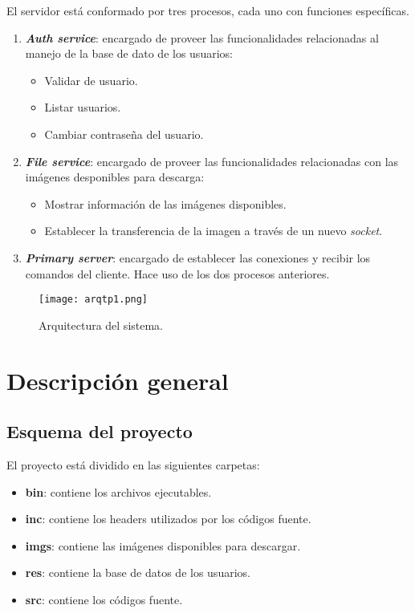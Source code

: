 \documentclass[12pt,a4paper]{article}
\begin{document}
El servidor está conformado por tres procesos, cada uno con funciones específicas.

\begin{enumerate}[leftmargin=1.5cm]
  \item \textbf{\emph{Auth service}}: encargado de proveer las funcionalidades relacionadas
  al manejo de la base de dato de los usuarios:

  \begin{itemize}[leftmargin=1cm]
    \item Validar de usuario.
    \item Listar usuarios.
    \item Cambiar contraseña del usuario.
  \end{itemize}

  \item \textbf{\emph{File service}}: encargado de proveer las funcionalidades relacionadas
  con las imágenes desponibles para descarga:

  \begin{itemize}[leftmargin=1cm]
    \item Mostrar información de las imágenes disponibles.
    \item Establecer la transferencia de la imagen a través de un nuevo
    \emph{socket}.
  \end{itemize}

  \item \textbf{\emph{Primary server}}: encargado de establecer las conexiones y recibir
  los comandos del cliente. Hace uso de los dos procesos anteriores.
\end{enumerate}

\begin{figure}[H]
  \centering
  \texttt{[image: arqtp1.png]}
  \caption{Arquitectura del sistema.}
  \label{arqui}
\end{figure}

\section{Descripción general}
\label{desc}

\subsection{Esquema del proyecto}
\label{esq}

El proyecto está dividido en las siguientes carpetas:

\begin{itemize}[leftmargin=1.5cm]
  \item \textbf{bin}: contiene los archivos ejecutables.
  \item \textbf{inc}: contiene los headers utilizados por los códigos fuente.
  \item \textbf{imgs}: contiene las imágenes disponibles para descargar.
  \item \textbf{res}: contiene la base de datos de los usuarios.
  \item \textbf{src}: contiene los códigos fuente.
\end{itemize}
\end{document}
